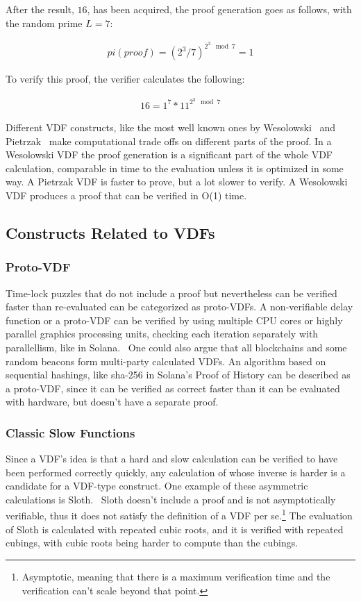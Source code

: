 After the result, \(16\), has been acquired, the proof generation goes as follows, with the random prime \(L=7\):

\begin{align*}
	pi (proof) = (2^3/7)^{2^3\mod 7} = 1
\end{align*}

To verify this proof, the verifier calculates the following:

\begin{align*}
	16 = 1^7 * 11^{2^3 \mod 7}
\end{align*}

Different VDF constructs, like the most well known ones by Wesolowski~\cite{Wesolowski2018} and Pietrzak~\cite{Pietrzak2018} make computational trade offs on different parts of the proof. In a Wesolowski VDF the proof generation is a significant part of the whole VDF calculation, comparable in time to the evaluation unless it is optimized in some way. A Pietrzak VDF is faster to prove, but a lot slower to verify. A Wesolowski VDF produces a proof that can be verified in O(1) time.

\subsection{Constructs Related to VDFs}
\subsubsection{Proto-VDF}
Time-lock puzzles that do not include a proof but nevertheless can be verified faster than re-evaluated can be categorized as proto-VDFs. A non-verifiable delay function or a proto-VDF can be verified by using multiple CPU cores or highly parallel graphics processing units, checking each iteration separately with parallellism, like in Solana.~\cite{Yakovenko2018-zn} One could also argue that all blockchains and some random beacons form multi-party calculated VDFs. An algorithm based on sequential hashings, like sha-256 in Solana's Proof of History can be described as a proto-VDF, since it can be verified as correct faster than it can be evaluated with hardware, but doesn't have a separate proof.

\subsubsection{Classic Slow Functions}
Since a VDF's idea is that a hard and slow calculation can be verified to have been performed correctly quickly, any calculation of whose inverse is harder is a candidate for a VDF-type construct. One example of these asymmetric calculations is Sloth.~\cite{Boneh2018-sm} Sloth doesn't include a proof and is not asymptotically verifiable, thus it does not satisfy the definition of a VDF per se.\footnote{Asymptotic, meaning that there is a maximum verification time and the verification can't scale beyond that point.} The evaluation of Sloth is calculated with repeated cubic roots, and it is verified with repeated cubings, with cubic roots being harder to compute than the cubings.

